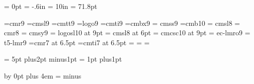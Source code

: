
 \onecol \let\rtitle\relax %


\TUBfinal

\nopagenumbers
\hoffset = 0pt
\voffset = -.6in
\vsize = 10in
\vfuzz = 71.8pt %

\def\scriptfonts{%
  \scriptfont0=\sevenrm
  \scriptfont\itfam=\sevensl
  \scriptfont\slfam=\sevensl
}

\iftrue %
  \font\tenrm=cmr9  \font\tensl=cmsl9  \font\tentt=cmtt9  \font\manual=logo9
  \font\tenit=cmti9 \font\tenbf=cmbx9 \font\sf = cmss9
  \font\difficultyfont=cmb10
  \font\smallsl = cmsl8  \font\smallrm = cmr8 \font\smallsy = cmsy9
  \font\manualsl = logosl10 at 9pt
  \font\slc = cmsl8 at 6pt
  \font\smc = cmcsc10 at 9pt
  \font\lslashfont = ec-lmro9
  \font\thanhfont = t5-lmr9
  \font\sevenrm=cmr7 at 6.5pt
  \font\sevensl=cmti7 at 6.5pt
  \scriptfonts
  \baselineskip=10.9pt
\fi

\rm  %

\newskip\abovedifficultyskip %
  \abovedifficultyskip = 5pt plus2pt minus1pt
\newskip\abovecapsuleskip    %
\abovecapsuleskip    = 1pt plus1pt

\advance\rightskip by 0pt plus 4em
\spaceskip = \tenrm minus \tenrm

